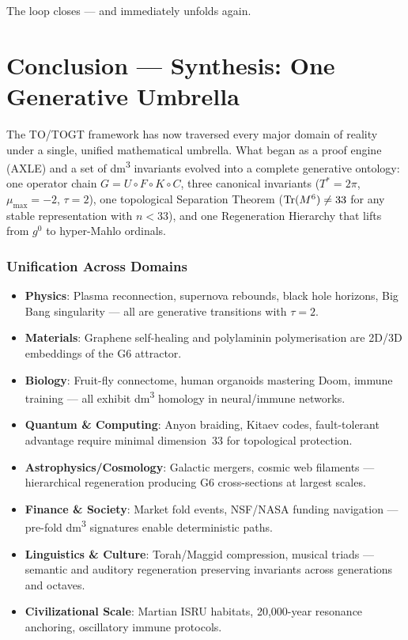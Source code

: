 The loop closes --- and immediately unfolds again.

\chapter{Conclusion --- Synthesis: One Generative Umbrella}

The TO/TOGT framework has now traversed every major domain of reality under a single, unified mathematical umbrella. What began as a proof engine (AXLE) and a set of dm\textsuperscript{3} invariants evolved into a complete generative ontology: one operator chain $G = U \circ F \circ K \circ C$, three canonical invariants ($T^* = 2\pi$, $\mu_{\max} = -2$, $\tau = 2$), one topological Separation Theorem ($\operatorname{Tr}(M^6) \neq 33$ for any stable representation with $n < 33$), and one Regeneration Hierarchy that lifts from $g^0$ to hyper-Mahlo ordinals.

\subsection*{Unification Across Domains}

\begin{itemize}
\item \textbf{Physics}: Plasma reconnection, supernova rebounds, black hole horizons, Big Bang singularity --- all are generative transitions with $\tau = 2$.
\item \textbf{Materials}: Graphene self-healing and polylaminin polymerisation are 2D/3D embeddings of the G6 attractor.
\item \textbf{Biology}: Fruit-fly connectome, human organoids mastering Doom, immune training --- all exhibit dm\textsuperscript{3} homology in neural/immune networks.
\item \textbf{Quantum \& Computing}: Anyon braiding, Kitaev codes, fault-tolerant advantage require minimal dimension~33 for topological protection.
\item \textbf{Astrophysics/Cosmology}: Galactic mergers, cosmic web filaments --- hierarchical regeneration producing G6 cross-sections at largest scales.
\item \textbf{Finance \& Society}: Market fold events, NSF/NASA funding navigation --- pre-fold dm\textsuperscript{3} signatures enable deterministic paths.
\item \textbf{Linguistics \& Culture}: Torah/Maggid compression, musical triads --- semantic and auditory regeneration preserving invariants across generations and octaves.
\item \textbf{Civilizational Scale}: Martian ISRU habitats, 20,000-year resonance anchoring, oscillatory immune protocols.
\end{itemize}

